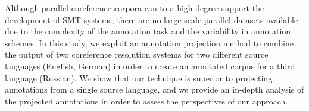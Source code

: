 Although parallel coreference corpora can to a high degree support the development of SMT systems, there are no large-scale parallel datasets available due to the complexity of the annotation task and the variability in annotation schemes. In this study, we exploit an annotation projection method to combine the output of two coreference resolution systems for two different source languages (English, German) in order to create an annotated corpus for a third language (Russian). We show that our technique is superior to projecting annotations from a single source language, and we provide an in-depth analysis of the projected annotations in order to assess the perspectives of our approach.
